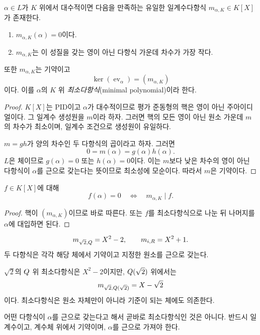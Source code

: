 \begin{theorem}[최소다항식]
$\alpha\in L$가 $K$ 위에서 대수적이면 다음을 만족하는 유일한 일계수다항식 $m_{\alpha,K}\in K[X]$가 존재한다.
\begin{enumerate}[label=(\roman*)]
  \item $m_{\alpha,K}(\alpha)=0$이다.
  \item $m_{\alpha,K}$는 이 성질을 갖는 영이 아닌 다항식 가운데 차수가 가장 작다.
\end{enumerate}
또한 $m_{\alpha,K}$는 기약이고
\[
  \ker(\operatorname{ev}_\alpha)=(m_{\alpha,K})
\]
이다. 이를 $\alpha$의 $K$ 위 \emph{최소다항식}(minimal polynomial)이라 한다.
\end{theorem}

\begin{proof}
$K[X]$는 PID이고 $\alpha$가 대수적이므로 평가 준동형의 핵은 영이 아닌 주아이디얼이다. 그 일계수 생성원을 $m$이라 하자. 그러면 핵의 모든 영이 아닌 원소 가운데 $m$의 차수가 최소이며, 일계수 조건으로 생성원이 유일하다.

$m=gh$가 양의 차수인 두 다항식의 곱이라고 하자. 그러면
\[
  0=m(\alpha)=g(\alpha)h(\alpha).
\]
$L$은 체이므로 $g(\alpha)=0$ 또는 $h(\alpha)=0$이다. 이는 $m$보다 낮은 차수의 영이 아닌 다항식이 $\alpha$를 근으로 갖는다는 뜻이므로 최소성에 모순이다. 따라서 $m$은 기약이다.
\end{proof}

\begin{corollary}[나눗셈 판정]
$f\in K[X]$에 대해
\[
  f(\alpha)=0
  \quad\Longleftrightarrow\quad
  m_{\alpha,K}\mid f.
\]
\end{corollary}

\begin{proof}
핵이 $(m_{\alpha,K})$이므로 바로 따른다. 또는 $f$를 최소다항식으로 나눈 뒤 나머지를 $\alpha$에 대입하면 된다.
\end{proof}

\begin{example}
\[
  m_{\sqrt2,Q}=X^2-2,
  \qquad
  m_{i,R}=X^2+1.
\]
두 다항식은 각각 해당 체에서 기약이고 지정한 원소를 근으로 갖는다.
\end{example}

\begin{example}
$\sqrt2$의 $Q$ 위 최소다항식은 $X^2-2$이지만, $Q(\sqrt2)$ 위에서는
\[
  m_{\sqrt2,Q(\sqrt2)}=X-\sqrt2
\]
이다. 최소다항식은 원소 자체만이 아니라 기준이 되는 체에도 의존한다.
\end{example}

\begin{pitfall}
어떤 다항식이 $\alpha$를 근으로 갖는다고 해서 곧바로 최소다항식인 것은 아니다. 반드시 일계수이고, 계수체 위에서 기약이며, $\alpha$를 근으로 가져야 한다.
\end{pitfall}

